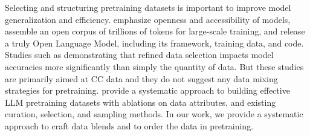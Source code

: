 \documentclass[11pt]{article}
\begin{document}
Selecting and structuring pretraining datasets is important to improve model generalization and efficiency.
\citet{llama3-dubey2024llama3herdmodels} emphasize openness and accessibility of models, \citet{together2023redpajama,soldaini-etal-2024-dolma} assemble an open corpus of trillions of tokens for large-scale training, and \citet{olmo-groeneveld-etal-2024-olmo} release a truly Open Language Model, including its framework, training data, and code. 
Studies such as \citet{li2024datacomplm,fineweb-penedo2024the} demonstrating that refined data selection impacts model accuracies more significantly than simply the quantity of data. 
But these studies are primarily aimed at CC data and they do not suggest any data mixing strategies for pretraining.
\citet{parmar-etal-2024-data} provide a systematic approach to building effective LLM pretraining datasets with ablations on data attributes, and existing curation, selection, and sampling methods. 
In our work, we provide a systematic approach to craft data blends and to order the data in pretraining.
\end{document}
